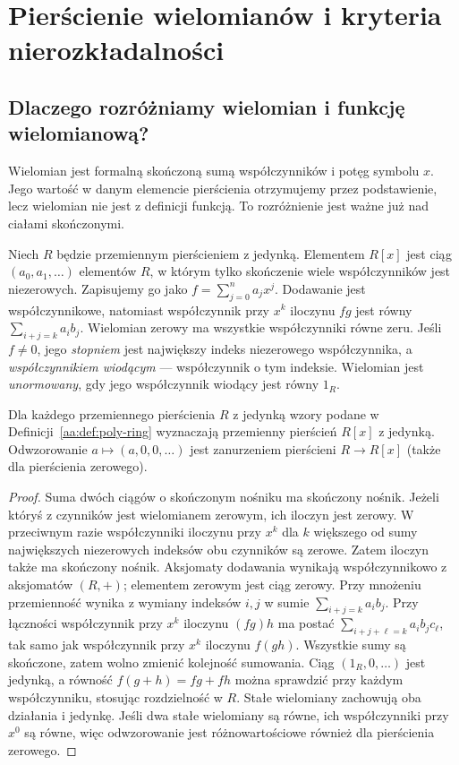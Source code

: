 \chapter{Pierścienie wielomianów i kryteria nierozkładalności}
\label{aa:ch:wielomiany}

\section{Dlaczego rozróżniamy wielomian i funkcję wielomianową?}
Wielomian jest formalną skończoną sumą współczynników i potęg
symbolu $x$. Jego wartość w danym elemencie pierścienia otrzymujemy
przez podstawienie, lecz wielomian nie jest z definicji funkcją.
To rozróżnienie jest ważne już nad ciałami skończonymi.

\begin{definicja}
\label{aa:def:poly-ring}
Niech $R$ będzie przemiennym pierścieniem z jedynką.
Elementem $R[x]$ jest ciąg $(a_0,a_1,\ldots)$ elementów $R$,
w którym tylko skończenie wiele współczynników jest niezerowych.
Zapisujemy go jako $f=\sum_{j=0}^n a_jx^j$.
Dodawanie jest współczynnikowe, natomiast współczynnik przy $x^k$
iloczynu $fg$ jest równy $\sum_{i+j=k}a_i b_j$.
Wielomian zerowy ma wszystkie współczynniki równe zeru.
Jeśli $f\ne0$, jego \emph{stopniem} jest największy indeks
niezerowego współczynnika, a \emph{współczynnikiem wiodącym}
--- współczynnik o tym indeksie. Wielomian jest \emph{unormowany},
gdy jego współczynnik wiodący jest równy $1_R$.
\end{definicja}

\begin{lemat}
\label{aa:lem:poly-ring-axioms}
Dla każdego przemiennego pierścienia $R$ z jedynką
wzory podane w Definicji~\ref{aa:def:poly-ring}
wyznaczają przemienny pierścień $R[x]$ z jedynką.
Odwzorowanie $a\mapsto(a,0,0,\ldots)$ jest zanurzeniem
pierścieni $R\to R[x]$ (także dla pierścienia zerowego).
\end{lemat}
\begin{proof}
Suma dwóch ciągów o skończonym nośniku ma skończony
nośnik. Jeżeli któryś z czynników jest wielomianem
zerowym, ich iloczyn jest zerowy. W przeciwnym razie
współczynniki iloczynu przy $x^k$ dla $k$ większego
od sumy największych niezerowych indeksów obu czynników
są zerowe. Zatem iloczyn także ma skończony nośnik.
Aksjomaty dodawania wynikają współczynnikowo z aksjomatów
$(R,+)$; elementem zerowym jest ciąg zerowy.
Przy mnożeniu przemienność wynika z wymiany indeksów
$i,j$ w sumie $\sum_{i+j=k}a_ib_j$. Przy łączności
współczynnik przy $x^k$ iloczynu $(fg)h$ ma postać
$\sum_{i+j+\ell=k} a_i b_j c_\ell$, tak samo
jak współczynnik przy $x^k$ iloczynu $f(gh)$.
Wszystkie sumy są skończone, zatem wolno zmienić kolejność
sumowania. Ciąg $(1_R,0,\ldots)$ jest jedynką,
a równość $f(g+h)=fg+fh$ można sprawdzić przy każdym
współczynniku, stosując rozdzielność w $R$.
Stałe wielomiany zachowują oba działania i jedynkę.
Jeśli dwa stałe wielomiany są równe, ich współczynniki
przy $x^0$ są równe, więc odwzorowanie jest różnowartościowe
również dla pierścienia zerowego.
\end{proof}

